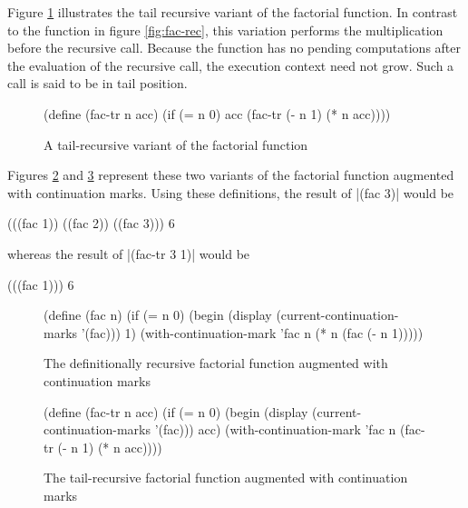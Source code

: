 Figure \ref{fig:fac-tail-rec} illustrates the tail recursive variant of the factorial
function. In contrast to the function in figure \ref{fig:fac-rec}, this variation performs
the multiplication before the recursive call. Because the function has no pending
computations after the evaluation of the recursive call, the execution context need not
grow. Such a call is said to be in tail position.

\begin{figure}
\begin{schemeblock}
\begin{schemedisplay}
(define (fac-tr n acc)
  (if (= n 0)
      acc
      (fac-tr (- n 1) (* n acc))))
\end{schemedisplay}
\end{schemeblock}
\caption{A tail-recursive variant of the factorial function}
\label{fig:fac-tail-rec}
\end{figure}

Figures \ref{fig:fac-rec-cm} and \ref{fig:fac-tail-rec-cm} represent these two variants of the
factorial function augmented with continuation marks. Using these definitions, the 
result of \scheme|(fac 3)| would be
\begin{schemeblock}
\begin{schemedisplay}
(((fac 1)) ((fac 2)) ((fac 3)))
6
\end{schemedisplay}
\end{schemeblock}
\noindent
whereas the result of \scheme|(fac-tr 3 1)| would be
\begin{schemeblock}
\begin{schemedisplay}
(((fac 1)))
6
\end{schemedisplay}
\end{schemeblock}

\begin{figure}
\begin{schemeblock}
\begin{schemedisplay}
(define (fac n)
  (if (= n 0)
      (begin
        (display (current-continuation-marks '(fac)))
        1)
      (with-continuation-mark 'fac n (* n (fac (- n 1)))))
\end{schemedisplay}
\end{schemeblock}
\caption{The definitionally recursive factorial function augmented with continuation marks}
\label{fig:fac-rec-cm}
\end{figure}

\begin{figure}
\begin{schemeblock}
\begin{schemedisplay}
(define (fac-tr n acc)
  (if (= n 0)
      (begin
        (display (current-continuation-marks '(fac)))
        acc)
      (with-continuation-mark 'fac n (fac-tr (- n 1) (* n acc))))
\end{schemedisplay}
\end{schemeblock}
\caption{The tail-recursive factorial function augmented with continuation marks}
\label{fig:fac-tail-rec-cm}
\end{figure}

